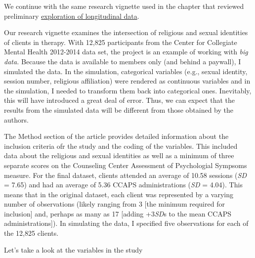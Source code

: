 \documentclass[
  english,
]{book}
\begin{document}
We continue with the same research vignette used in the chapter that reviewed preliminary \protect\hyperlink{MLMexplore}{exploration of longitudinal data}.

Our research vignette \citep{lefevor_religious_2017} examines the intersection of religious and sexual identities of clients in therapy. With 12,825 participants from the Center for Collegiate Mental Health 2012-2014 data set, the project is an example of working with \emph{big data.} Because the data is available to members only (and behind a paywall), I simulated the data. In the simulation, categorical variables (e.g., sexual identity, session number, religious affiliation) were rendered as continuous variables and in the simulation, I needed to transform them back into categorical ones. Inevitably, this will have introduced a great deal of error. Thus, we can expect that the results from the simulated data will be different from those obtained by the authors.

The Method section of the article provides detailed information about the inclusion criteria ofr the study and the coding of the variables. This included data about the religious and sexual identities as well as a minimum of three separate scores on the Counseling Center Assessment of Psychologial Sympsoms \citep[CCAPS,][]{locke_development_2012} measure. For the final dataset, clients attended an average of 10.58 sessions (\emph{SD} = 7.65) and had an average of 5.36 CCAPS administrations (\emph{SD} = 4.04). This means that in the original dataset, each client was represented by a varying number of observations (likely ranging from 3 {[}the minimum required for inclusion{]} and, perhaps as many as 17 {[}adding +3\emph{SD}s to the mean CCAPS administrations{]}). In simulating the data, I specified five observations for each of the 12,825 clients.

Let's take a look at the variables in the study
\end{document}
